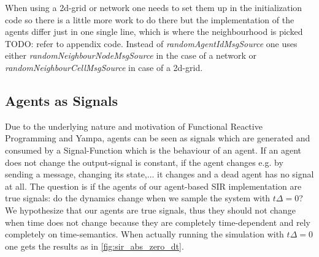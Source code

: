 When using a 2d-grid or network one needs to set them up in the initialization code so there is a little more work to do there but the implementation of the agents differ just in one single line, which is where the neighbourhood is picked TODO: refer to appendix code. Instead of \textit{randomAgentIdMsgSource} one uses either \textit{randomNeighbourNodeMsgSource} in the case of a network or \textit{randomNeighbourCellMsgSource} in case of a 2d-grid.

\subsection{Agents as Signals}
Due to the underlying nature and motivation of Functional Reactive Programming and Yampa, agents can be seen as signals which are generated and consumed by a Signal-Function which is the behaviour of an agent.  If an agent does not change the output-signal is constant, if the agent changes e.g. by sending a message, changing its state,... it changes and a dead agent has no signal at all.
The question is if the agents of our agent-based SIR implementation are true signals: do the dynamics change when we sample the system with $t\Delta = 0$? We hypothesize that our agents are true signals, thus they should not change when time does not change because they are completely time-dependent and rely completely on time-semantics. When actually running the simulation with $t\Delta = 0$ one gets the results as in \ref{fig:sir_abs_zero_dt}.

